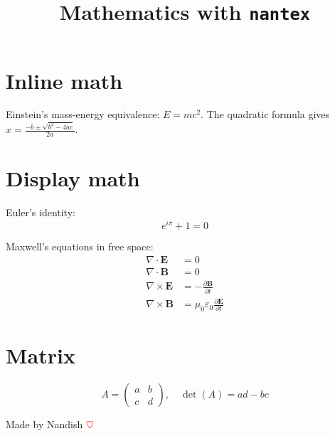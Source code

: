 \documentclass{article}
\title{Mathematics with \texttt{nantex}}
\author{}
\date{}
\begin{document}
\maketitle

\section*{Inline math}
Einstein's mass-energy equivalence: $E = mc^2$.
The quadratic formula gives $x = \frac{-b \pm \sqrt{b^2 - 4ac}}{2a}$.

\section*{Display math}
Euler's identity:
\[
  e^{i\pi} + 1 = 0
\]

Maxwell's equations in free space:
\begin{align}
  \nabla \cdot \mathbf{E}  &= 0 \\
  \nabla \cdot \mathbf{B}  &= 0 \\
  \nabla \times \mathbf{E} &= -\frac{\partial \mathbf{B}}{\partial t} \\
  \nabla \times \mathbf{B} &= \mu_0\varepsilon_0 \frac{\partial \mathbf{E}}{\partial t}
\end{align}

\section*{Matrix}
\[
  A = \begin{pmatrix} a & b \\ c & d \end{pmatrix},
  \quad \det(A) = ad - bc
\]

\vfill
\begin{center}
  \small Made by Nandish \textcolor{red}{$\heartsuit$}
\end{center}
\end{document}
